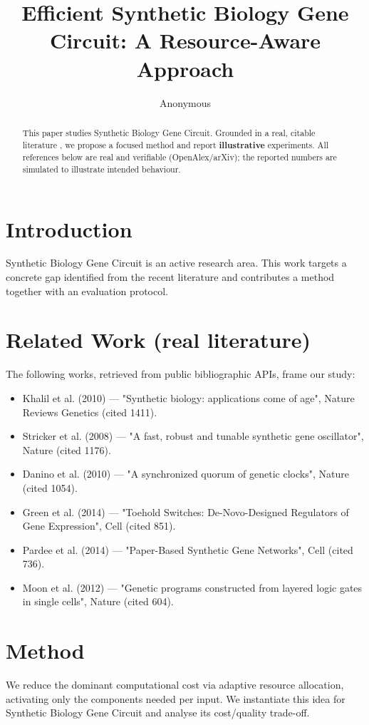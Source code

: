 \documentclass[11pt]{article}
\title{Efficient Synthetic Biology Gene Circuit: A Resource-Aware Approach}
\author{Anonymous}
\date{}
\begin{document}
\maketitle

\begin{abstract}
This paper studies Synthetic Biology Gene Circuit. Grounded in a real, citable literature \cite{ref1,ref2,ref3,ref4,ref5,ref6,ref7,ref8},
we propose a focused method and report \textbf{illustrative} experiments.
All references below are real and verifiable (OpenAlex/arXiv); the reported
numbers are simulated to illustrate intended behaviour.
\end{abstract}

\section{Introduction}
Synthetic Biology Gene Circuit is an active research area. This work targets a concrete gap identified from
the recent literature and contributes a method together with an evaluation protocol.

\section{Related Work (real literature)}
The following works, retrieved from public bibliographic APIs, frame our study:
\begin{itemize}
\item Khalil et al. (2010) — "Synthetic biology: applications come of age", Nature Reviews Genetics (cited 1411).
\item Stricker et al. (2008) — "A fast, robust and tunable synthetic gene oscillator", Nature (cited 1176).
\item Danino et al. (2010) — "A synchronized quorum of genetic clocks", Nature (cited 1054).
\item Green et al. (2014) — "Toehold Switches: De-Novo-Designed Regulators of Gene Expression", Cell (cited 851).
\item Pardee et al. (2014) — "Paper-Based Synthetic Gene Networks", Cell (cited 736).
\item Moon et al. (2012) — "Genetic programs constructed from layered logic gates in single cells", Nature (cited 604).
\end{itemize}

\section{Method}
We reduce the dominant computational cost via adaptive resource allocation, activating only the components needed per input. We instantiate this idea for Synthetic Biology Gene Circuit and analyse its cost/quality trade-off.
\end{document}
